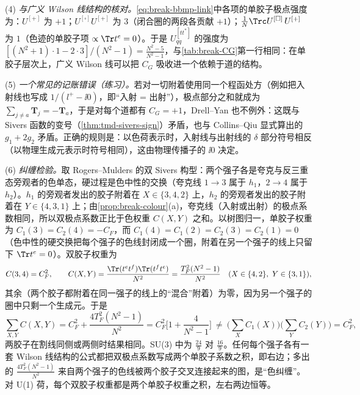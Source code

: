 \begin{example}
(4) \emph{与广义 Wilson 线结构的核对。}\cref{eq:break-bbmp-link}中各项的单胶子极点强度为：$U^{[+]}$ 为 $+1$；$U^{[\square]}U^{[+]}$ 为 $3$（闭合圈的两段各贡献 $+1$）；$\frac1N\Trc U^{[\square]}\,U^{[+]}$ 为 $1$（色迹的单胶子项 $\propto\Tr t^e=0$）。于是 $U^{[tt^*]}_{qq}$ 的强度为 $[(N^2+1)\cdot1-2\cdot3]/(N^2-1)=\frac{N^2-5}{N^2-1}$，与\cref{tab:break-CG}第一行相同：在单胶子层次上，广义 Wilson 线可以把 $C_G$ 吸收进一个依赖于道的结构。

(5) \emph{一个常见的记账错误（练习）。}若对一切附着使用同一个程函处方（例如把入射线也写成 $1/(l^+-\ii0)$，即“入射 = 出射”），极点部分之和就成为 $\sum_{j\neq a}\mathbf T_j=-\mathbf T_a$，于是对每个道都有 $C_G=+1$，Drell--Yan 也不例外：这既与 Sivers 函数的变号（\cref{thm:tmd-sivers-sign}）矛盾，也与 Collins--Qiu 显式算出的 $g_1+2g_2$ 矛盾。正确的规则是：以色荷表示时，入射线与出射线的 $\delta$ 部分符号相反（以物理生成元表示时符号相同），这由物理传播子的 $\ii0$ 决定。

(6) \emph{纠缠检验。}取 Rogers--Mulders 的双 Sivers 构型\cite{RogersMulders2010}：两个强子各是夸克与反三重态旁观者的色单态，硬过程是色中性的交换（夸克线 $1\to3$ 属于 $h_1$，$2\to4$ 属于 $h_2$）。$h_1$ 的旁观者发出的胶子附着在 $X\in\{3,4,2\}$ 上，$h_2$ 的旁观者发出的胶子附着在 $Y\in\{4,3,1\}$ 上；由\cref{prop:break-colour}(a)，夸克线（入射或出射）的极点系数相同，所以双极点系数正比于色权重 $C(X,Y)$ 之和。以树图归一，单胶子权重为 $C_1(3)=C_2(4)=-C_F$，而 $C_1(4)=C_1(2)=C_2(3)=C_2(1)=0$（色中性的硬交换把每个强子的色线封闭成一个圈，附着在另一个强子的线上只留下 $\Tr t^e=0$）。双胶子权重为
\begin{equation}\label{eq:break-entangle-weights}
C(3,4)=C_F^2,\qquad C(X,Y)=\frac{\Tr(t^et^f)\Tr(t^ft^e)}{N^2}=\frac{T_F^2(N^2-1)}{N^2}\quad(X\in\{4,2\},\ Y\in\{3,1\}),
\end{equation}
其余（两个胶子都附着在同一强子的线上的“混合”附着）为零，因为另一个强子的圈中只剩一个生成元。于是
\begin{equation}\label{eq:break-entangle}
\sum_{X,Y}C(X,Y)=C_F^2+\frac{4T_F^2(N^2-1)}{N^2}=C_F^2\Big[1+\frac{4}{N^2-1}\Big]\ \neq\ \Big(\sum_XC_1(X)\Big)\Big(\sum_YC_2(Y)\Big)=C_F^2 ,
\end{equation}
两胶子在割线同侧或两侧时结果相同。SU(3) 中为 $\frac{24}9$ 对 $\frac{16}9$。任何每个强子各有一套 Wilson 线结构的公式都把双极点系数写成两个单胶子系数之积，即右边；多出的 $\frac{4T_F^2(N^2-1)}{N^2}$ 来自两个强子的色线被两个胶子交叉连接起来的图，是“色纠缠”。对 U(1) 荷，每个双胶子权重都是两个单胶子权重之积，左右两边恒等。
\end{example}

